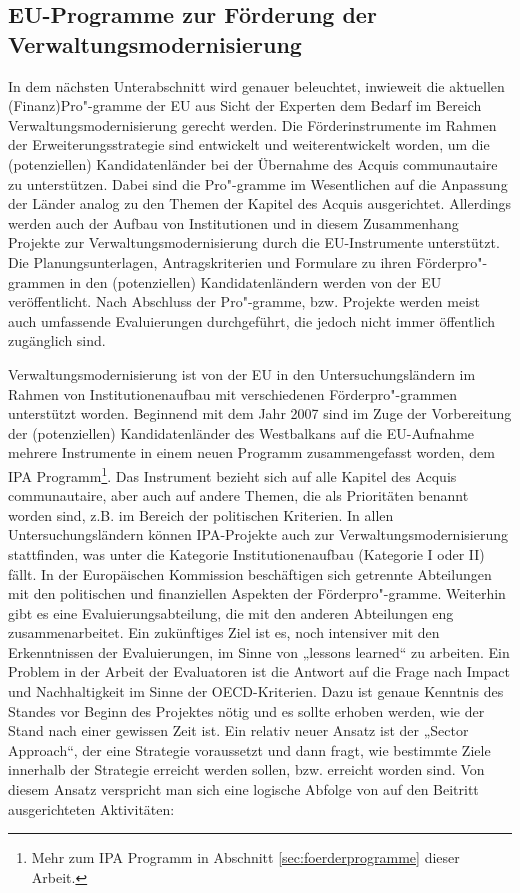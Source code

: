 \subsection{EU-Programme zur Förderung der Verwaltungsmodernisierung }
In dem nächsten Unterabschnitt wird genauer beleuchtet, inwieweit die aktuellen (Finanz)Pro"-gramme der EU aus Sicht der Experten dem Bedarf im Bereich Verwaltungsmodernisierung gerecht werden. Die Förderinstrumente im Rahmen der Erweiterungsstrategie sind entwickelt und weiterentwickelt worden, um die (potenziellen) Kandidatenländer bei der Übernahme des Acquis communautaire zu unterstützen. Dabei sind die Pro"-gramme im Wesentlichen auf die Anpassung der Länder analog zu den Themen der Kapitel des Acquis ausgerichtet. Allerdings werden auch der Aufbau von Institutionen und in diesem Zusammenhang Projekte zur Verwaltungsmodernisierung durch die EU-Instrumente unterstützt. Die Planungsunterlagen, Antragskriterien und Formulare zu ihren Förderpro"-grammen in den (potenziellen) Kandidatenländern werden von der EU veröffentlicht. Nach Abschluss der Pro"-gramme, bzw. Projekte werden meist auch umfassende Evaluierungen durchgeführt, die jedoch nicht immer öffentlich zugänglich sind.\par
Verwaltungsmodernisierung ist von der EU in den Untersuchungsländern im Rahmen von Institutionenaufbau mit verschiedenen Förderpro"-grammen unterstützt worden. Beginnend mit dem Jahr 2007 sind im Zuge der Vorbereitung der (potenziellen) Kandidatenländer des Westbalkans auf die EU-Aufnahme mehrere Instrumente in einem neuen Programm zusammengefasst worden, dem IPA Programm\footnote{Mehr zum IPA Programm in Abschnitt \ref{sec:foerderprogramme} dieser Arbeit.}. Das Instrument bezieht sich auf alle Kapitel des Acquis communautaire, aber auch auf andere Themen, die als Prioritäten benannt worden sind, z.B. im Bereich der politischen Kriterien. In allen Untersuchungsländern können IPA-Projekte auch zur Verwaltungsmodernisierung stattfinden, was unter die Kategorie Institutionenaufbau (Kategorie I oder II) fällt. In der Europäischen Kommission beschäftigen sich getrennte Abteilungen mit den politischen und finanziellen Aspekten der Förderpro"-gramme. Weiterhin gibt es eine Evaluierungsabteilung, die mit den anderen Abteilungen eng zusammenarbeitet. Ein zukünftiges Ziel ist es, noch intensiver mit den Erkenntnissen der Evaluierungen, im Sinne von „lessons learned“ zu arbeiten. Ein Problem in der Arbeit der Evaluatoren ist die Antwort auf die Frage nach Impact und Nachhaltigkeit im Sinne der OECD-Kriterien. Dazu ist genaue Kenntnis des Standes vor Beginn des Projektes nötig und es sollte erhoben werden, wie der Stand nach einer gewissen Zeit ist. Ein relativ neuer Ansatz ist der „Sector Approach“, der eine Strategie voraussetzt und dann fragt, wie bestimmte Ziele innerhalb der Strategie erreicht werden sollen, bzw. erreicht worden sind. Von diesem Ansatz verspricht man sich eine logische Abfolge von auf den Beitritt ausgerichteten Aktivitäten:
